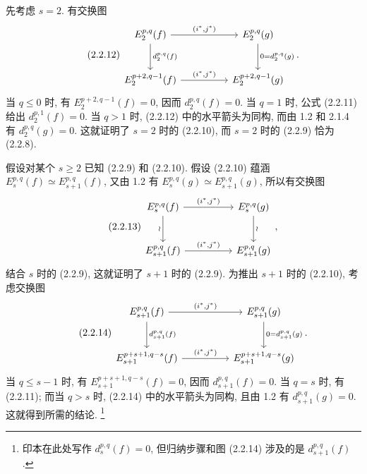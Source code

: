 先考虑 $s=2$. 有交换图
\begin{equation}\tag{2.2.12}
\begin{tikzcd}[column sep=huge,row sep=large]
E_2^{p,q}(f)
  \arrow[r,"{(i^*,j^*)}"]
  \arrow[d,"{d_2^{p,q}(f)}"]
&
E_2^{p,q}(g)
  \arrow[d,"{0=d_2^{p,q}(g)}"]
\\
E_2^{p+2,q-1}(f)
  \arrow[r,"{(i^*,j^*)}"]
&
E_2^{p+2,q-1}(g)
\end{tikzcd}.
\end{equation}
当 $q\leq0$ 时, 有 $E_2^{p+2,q-1}(f)=0$, 因而 $d_2^{p,q}(f)=0$. 当 $q=1$ 时, 公式 (2.2.11) 给出 $d_2^{p,1}(f)=0$. 当 $q>1$ 时, (2.2.12) 中的水平箭头为同构, 而由 1.2 和 2.1.4 有 $d_2^{p,q}(g)=0$. 这就证明了 $s=2$ 时的 (2.2.10), 而 $s=2$ 时的 (2.2.9) 恰为 (2.2.8).

假设对某个 $s\geq2$ 已知 (2.2.9) 和 (2.2.10). 假设 (2.2.10) 蕴涵 $E_s^{p,q}(f)\simeq E_{s+1}^{p,q}(f)$, 又由 1.2 有 $E_s^{p,q}(g)\simeq E_{s+1}^{p,q}(g)$, 所以有交换图
\begin{equation}\tag{2.2.13}
\begin{tikzcd}[column sep=huge,row sep=large]
E_s^{p,q}(f)
  \arrow[r,"{(i^*,j^*)}"]
  \arrow[d,"\wr"']
&
E_s^{p,q}(g)
  \arrow[d,"\wr"]
\\
E_{s+1}^{p,q}(f)
  \arrow[r,"{(i^*,j^*)}"]
&
E_{s+1}^{p,q}(g)
\end{tikzcd},
\end{equation}
结合 $s$ 时的 (2.2.9), 这就证明了 $s+1$ 时的 (2.2.9). 为推出 $s+1$ 时的 (2.2.10), 考虑交换图
\begin{equation}\tag{2.2.14}
\begin{tikzcd}[column sep=huge,row sep=large]
E_{s+1}^{p,q}(f)
  \arrow[r,"{(i^*,j^*)}"]
  \arrow[d,"{d_{s+1}^{p,q}(f)}"]
&
E_{s+1}^{p,q}(g)
  \arrow[d,"{0=d_{s+1}^{p,q}(g)}"]
\\
E_{s+1}^{p+s+1,q-s}(f)
  \arrow[r,"{(i^*,j^*)}"]
&
E_{s+1}^{p+s+1,q-s}(g)
\end{tikzcd}.
\end{equation}
当 $q\leq s-1$ 时, 有 $E_{s+1}^{p+s+1,q-s}(f)=0$, 因而 $d_{s+1}^{p,q}(f)=0$. 当 $q=s$ 时, 有 (2.2.11); 而当 $q>s$ 时, (2.2.14) 中的水平箭头为同构, 且由 1.2 有 $d_{s+1}^{p,q}(g)=0$. 这就得到所需的结论.
\footnote{印本在此处写作 $d_s^{p,q}(f)=0$, 但归纳步骤和图 (2.2.14) 涉及的是 $d_{s+1}^{p,q}(f)$.}

